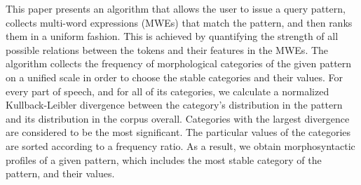 This paper presents an algorithm that allows the user to issue a query pattern, collects
 multi-word expressions (MWEs) that match
 the pattern, and then ranks them in a uniform
 fashion. This is achieved by quantifying the
 strength of all possible relations between the
 tokens and their features in the MWEs. The algorithm
 collects the frequency of morphological
 categories of the given pattern on a unified
 scale in order to choose the stable categories
 and their values. For every part of speech, and
 for all of its categories, we calculate a normalized
 Kullback-Leibler divergence between the
 category's distribution in the pattern and its
 distribution in the corpus overall. Categories
 with the largest divergence are considered to
 be the most significant. The particular values
 of the categories are sorted according to
 a frequency ratio. As a result, we obtain morphosyntactic
 profiles of a given pattern, which
 includes the most stable category of the pattern,
 and their values.


